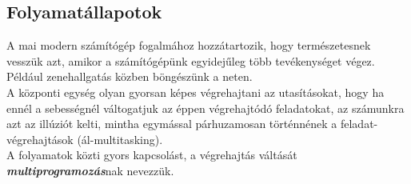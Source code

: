 \documentclass[tikz,12pt,margin=0px]{article}
\begin{document}
    \subsection*{Folyamatállapotok}

    \noindent A mai modern számítógép fogalmához hozzátartozik, hogy természetesnek vesszük azt, amikor a számítógépünk egyidejűleg több tevékenységet végez. Például zenehallgatás közben böngészünk a neten.\\

    \noindent A központi egység olyan gyorsan képes végrehajtani az utasításokat, hogy ha ennél a sebességnél váltogatjuk az éppen végrehajtódó feladatokat, az számunkra azt az illúziót kelti, mintha egymással párhuzamosan történnének a feladat-végrehajtások (ál-multitasking).\\

    \noindent A folyamatok közti gyors kapcsolást, a végrehajtás váltását \emph{\textbf{multiprogramozás}}nak nevezzük.\\
\end{document}
